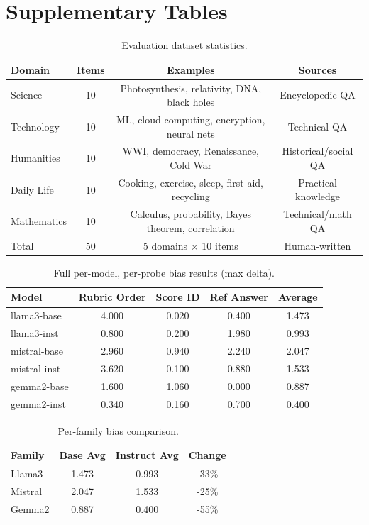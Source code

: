 \section{Supplementary Tables}

\begin{table}[h]
\centering\small
\caption{Evaluation dataset statistics.}
\label{tab:items}
\begin{tabular}{lccc}
\toprule
Domain & Items & Examples & Sources \\
\midrule
Science & 10 & Photosynthesis, relativity, DNA, black holes & Encyclopedic QA \\
Technology & 10 & ML, cloud computing, encryption, neural nets & Technical QA \\
Humanities & 10 & WWI, democracy, Renaissance, Cold War & Historical/social QA \\
Daily Life & 10 & Cooking, exercise, sleep, first aid, recycling & Practical knowledge \\
Mathematics & 10 & Calculus, probability, Bayes theorem, correlation & Technical/math QA \\
\midrule
Total & 50 & 5 domains $\times$ 10 items & Human-written \\
\bottomrule
\end{tabular}
\end{table}

\begin{table}[h]
\centering\small
\caption{Full per-model, per-probe bias results (max delta).}
\label{tab:full}
\begin{tabular}{lcccc}
\toprule
Model & Rubric Order & Score ID & Ref Answer & Average \\
\midrule
llama3-base & 4.000 & 0.020 & 0.400 & 1.473 \\
llama3-inst & 0.800 & 0.200 & 1.980 & 0.993 \\
mistral-base & 2.960 & 0.940 & 2.240 & 2.047 \\
mistral-inst & 3.620 & 0.100 & 0.880 & 1.533 \\
gemma2-base & 1.600 & 1.060 & 0.000 & 0.887 \\
gemma2-inst & 0.340 & 0.160 & 0.700 & 0.400 \\
\bottomrule
\end{tabular}
\end{table}

\begin{table}[h]
\centering\small
\caption{Per-family bias comparison.}
\label{tab:families}
\begin{tabular}{lccc}
\toprule
Family & Base Avg & Instruct Avg & Change \\
\midrule
Llama3 & 1.473 & 0.993 & -33\% \\
Mistral & 2.047 & 1.533 & -25\% \\
Gemma2 & 0.887 & 0.400 & -55\% \\
\bottomrule
\end{tabular}
\end{table}

